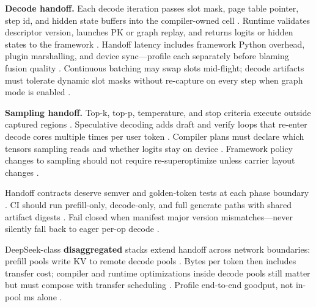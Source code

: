 \textbf{Decode handoff.} Each decode iteration passes slot mask, page table pointer, step id, and hidden state buffers into the compiler-owned cell \citep{kwon2023vllm,yirage2026,chen2020compilerbasedhardw,patel2025llminference,nvidia2024cudagraphs,memoryfloor2026,taxbreak2026,dao2022flashattention,dlbook}. Runtime validates descriptor version, launches PK or graph replay, and returns logits or hidden states to the framework \citep{yirage2026,nvidia2024cudagraphs,chen2020compilerbasedhardw,patel2025llminference,kwon2023vllm,dlbook}. Handoff latency includes framework Python overhead, plugin marshalling, and device sync---profile each separately before blaming fusion quality \citep{patel2025llminference,yirage2026,chen2020compilerbasedhardw,kwon2023vllm,taxbreak2026,memoryfloor2026,dlbook}. Continuous batching may swap slots mid-flight; decode artifacts must tolerate dynamic slot masks without re-capture on every step when graph mode is enabled \citep{kwon2023vllm,nvidia2024cudagraphs,yirage2026,chen2020compilerbasedhardw,patel2025llminference,memoryfloor2026,dlbook}.

\textbf{Sampling handoff.} Top-k, top-p, temperature, and stop criteria execute outside captured regions \citep{nvidia2024cudagraphs,kwon2023vllm,patel2025llminference,yirage2026,chen2020compilerbasedhardw,dlbook}. Speculative decoding adds draft and verify loops that re-enter decode cores multiple times per user token \citep{patel2025llminference,kwon2023vllm,yirage2026,chen2020compilerbasedhardw,taxbreak2026,memoryfloor2026,dlbook}. Compiler plans must declare which tensors sampling reads and whether logits stay on device \citep{yirage2026,chen2020compilerbasedhardw,patel2025llminference,dlbook}. Framework policy changes to sampling should not require re-superoptimize unless carrier layout changes \citep{patel2025llminference,yirage2026,chen2020compilerbasedhardw,kwon2023vllm,dlbook}.

Handoff contracts deserve semver and golden-token tests at each phase boundary \citep{yirage2026,chen2020compilerbasedhardw,patel2025llminference,kwon2023vllm,dlbook}. CI should run prefill-only, decode-only, and full generate paths with shared artifact digests \citep{yirage2026,chen2020compilerbasedhardw,patel2025llminference,kwon2023vllm,taxbreak2026,memoryfloor2026,dlbook}. Fail closed when manifest major version mismatches---never silently fall back to eager per-op decode \citep{yirage2026,chen2020compilerbasedhardw,patel2025llminference,kwon2023vllm,dlbook}.

DeepSeek-class \textbf{disaggregated} stacks extend handoff across network boundaries: prefill pools write KV to remote decode pools \citep{liu2024deepseekv3,patel2025llminference,yirage2026,chen2020compilerbasedhardw,kwon2023vllm,dlbook}. Bytes per token then includes transfer cost; compiler and runtime optimizations inside decode pools still matter but must compose with transfer scheduling \citep{liu2024deepseekv3,patel2025llminference,memoryfloor2026,yirage2026,chen2020compilerbasedhardw,dlbook}. Profile end-to-end goodput, not in-pool ms alone \citep{patel2025llminference,liu2024deepseekv3,yirage2026,chen2020compilerbasedhardw,dlbook}.

